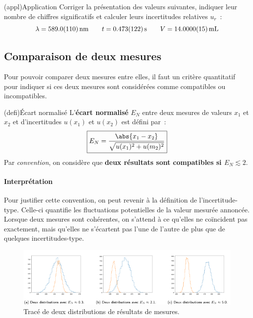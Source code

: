 \documentclass[../main/main.tex]{subfiles}
\begin{document}
\begin{tcb}(appl){Application}
  Corriger la présentation des valeurs suivantes, indiquer leur nombre de
  chiffres significatifs et calculer leurs incertitudes relatives $u_r$~:
  \[
    \lambda = \SI{589.0\pm11}{nm}
    \qquad 
    t = \SI{0.473 \pm 0.122}{s}
    \qquad 
    V = \SI{14 \pm 0.0015}{mL}
  \]
  \tcblower
\end{tcb}

\subsection{Comparaison de deux mesures}
Pour pouvoir comparer deux mesures entre elles, il faut un critère quantitatif
pour indiquer si ces deux mesures sont considérées comme compatibles ou
incompatibles.
\begin{tcb}(defi){Écart normalisé}
  L'\textbf{écart normalisé} $E_N$ entre deux mesures de valeurs $x_1$ et $x_2$ et d'incertitudes
  $u(x_1)$ et $u(x_2)$ est défini par~:
  \[
    \boxed{E_N = \frac{\abs{x_1-x_2}}{\sqrt{u(x_1)^{2} + u(m_2)^{2}}}}
  \]
  Par \textit{convention}, on considère que \textbf{deux résultats sont
  compatibles si $E_N \lesssim 2$}.
\end{tcb}

\paragraph*{Interprétation}
Pour justifier cette convention, on peut revenir à la définition de
l'incertitude-type. Celle-ci quantifie les fluctuations potentielles de la
valeur mesurée annoncée. Lorsque deux mesures sont cohérentes, on s'attend à ce
qu'elles ne coïncident pas exactement, mais qu'elles ne s'écartent pas l'une de
l'autre de plus que de quelques incertitudes-type.

\begin{figure}[htbp]
  \centering
  \includegraphics[scale=1]{zscore}
  \caption{Tracé de deux distributions de résultats de mesures.}
  \label{fig:zscore}
\end{figure}
\end{document}
